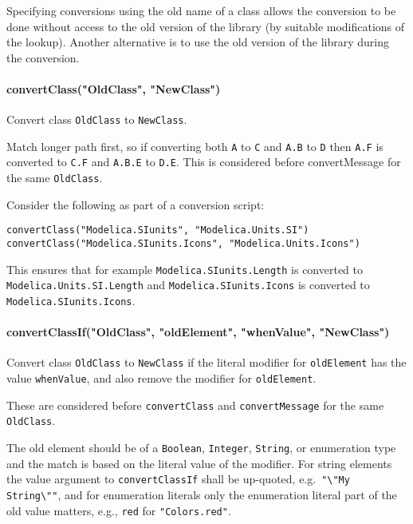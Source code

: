 \begin{nonnormative}
Specifying conversions using the old name of a class allows the conversion to be done without access to the old
version of the library (by suitable modifications of the lookup).  Another alternative is to use the old version
of the library during the conversion.
\end{nonnormative}

\paragraph*{convertClass("OldClass", "NewClass")}\label{convertclassoldclassnewclass}

Convert class \lstinline!OldClass! to \lstinline!NewClass!.

Match longer path first, so if converting both \lstinline!A! to \lstinline!C! and \lstinline!A.B! to \lstinline!D! then
\lstinline!A.F! is converted to \lstinline!C.F! and \lstinline!A.B.E! to \lstinline!D.E!. This is considered before
convertMessage for the same \lstinline!OldClass!.

\begin{example}
Consider the following as part of a conversion script:
\begin{lstlisting}[language=modelica]
convertClass("Modelica.SIunits", "Modelica.Units.SI")
convertClass("Modelica.SIunits.Icons", "Modelica.Units.Icons")
\end{lstlisting}
This ensures that for example \lstinline!Modelica.SIunits.Length! is converted to \lstinline!Modelica.Units.SI.Length!
and \lstinline!Modelica.SIunits.Icons! is converted to \lstinline!Modelica.SIunits.Icons!.
\end{example}

\paragraph*{convertClassIf("OldClass", "oldElement", "whenValue", "NewClass")}\label{convertclassifoldclass-oldelement-whenvalue-newclass}

Convert class \lstinline!OldClass! to \lstinline!NewClass! if the literal modifier for
\lstinline!oldElement! has the value \lstinline!whenValue!, and also remove the modifier for
\lstinline!oldElement!.

These are considered before \lstinline!convertClass! and \lstinline!convertMessage! for the same
\lstinline!OldClass!.

The old element should be of a \lstinline!Boolean!, \lstinline!Integer!, \lstinline!String!, or enumeration
type and the match is based on the literal value of the modifier.
For string elements the value argument to \lstinline!convertClassIf! shall be up-quoted, e.g.\ \lstinline!"\"My String\""!,
and for enumeration literals only the enumeration literal part of the old value matters, e.g., \lstinline!red!
for \lstinline!"Colors.red"!.

